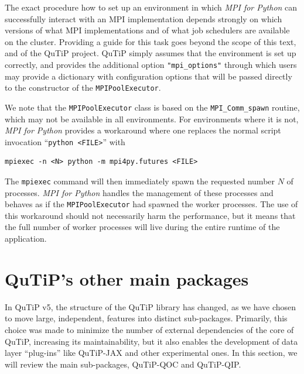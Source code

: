 \documentclass[preprint,3p,sort&compress]{elsarticle}
\def\code#1{\texttt{#1}}
\begin{document}
The exact procedure how to set up an environment in which \emph{MPI for Python} can successfully interact with an MPI implementation depends strongly on which versions of what MPI implementations and of what job schedulers are available on the cluster.
Providing a guide for this task goes beyond the scope of this text, and of the QuTiP project.
QuTiP simply assumes that the environment is set up correctly, and provides the additional option \code{"mpi\_options"} through which users may provide a dictionary with configuration options that will be passed directly to the constructor of the \code{MPIPoolExecutor}.

We note that the \code{MPIPoolExecutor} class is based on the \code{MPI\_Comm\_spawn} routine, which may not be available in all environments.
For environments where it is not, \emph{MPI for Python} provides a workaround where one replaces the normal script invocation ``\verb+python <FILE>+'' with
\begin{verbatim}
mpiexec -n <N> python -m mpi4py.futures <FILE>
\end{verbatim}
The \code{mpiexec} command will then immediately spawn the requested number $N$ of processes.
\emph{MPI for Python} handles the management of these processes and behaves as if the \code{MPIPoolExecutor} had spawned the worker processes.
The use of this workaround should not necessarily harm the performance, but it means that the full number of worker processes will live during the entire runtime of the application.



\section{QuTiP's other main packages}

In QuTiP v5, the structure of the QuTiP library has changed, as we have chosen to move large, independent, features into distinct sub-packages. Primarily, this choice was made to minimize the number of external dependencies of the core of QuTiP, increasing its maintainability, but it also enables the development of data layer ``plug-ins'' like QuTiP-JAX and other experimental ones.  In this section, we will review the main sub-packages, QuTiP-QOC and QuTiP-QIP.
\end{document}
